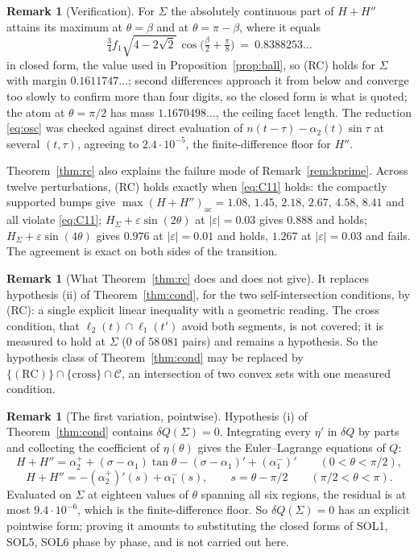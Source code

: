 \documentclass[11pt]{article}
\theoremstyle{definition}
\newtheorem{remark}[theorem]{Remark}
\newcommand{\Sig}{\Sigma}
\begin{document}
\begin{remark}[Verification]\label{rem:rcnum}
For $\Sig$ the absolutely continuous part of $H+H''$ attains its maximum at $\theta=\beta$
and at $\theta=\pi-\beta$, where it equals
\[
  \tfrac34f_1\sqrt{4-2\sqrt2}\,\cos\bigl(\tfrac\beta2+\tfrac\pi8\bigr)
  \ =\ 0.8388253\ldots
\]
in closed form, the value used in Proposition~\ref{prop:ball}, so (RC) holds for $\Sig$
with margin $0.1611747\ldots$; second differences approach it from below and converge too
slowly to confirm more than four digits, so the closed form is what is quoted; the atom at $\theta=\pi/2$
has mass $1.1670498\ldots$, the ceiling facet length. The reduction \eqref{eq:osc} was
checked against direct evaluation of $n(t-\tau)-\alpha_2(t)\sin\tau$ at several
$(t,\tau)$, agreeing to $2.4\cdot10^{-5}$, the finite-difference floor for $H''$.

Theorem~\ref{thm:rc} also explains the failure mode of Remark~\ref{rem:kprime}. Across
twelve perturbations, (RC) holds exactly when \eqref{eq:C11} holds:
the compactly supported bumps give
$\max(H+H'')_{\mathrm{ac}}=1.08,\,1.45,\,2.18,\,2.67,\,4.58,\,8.41$ and all violate
\eqref{eq:C11}; $H_\Sig+\varepsilon\sin(2\theta)$ at $|\varepsilon|=0.03$ gives $0.888$
and holds; $H_\Sig+\varepsilon\sin(4\theta)$ gives $0.976$ at $|\varepsilon|=0.01$ and
holds, $1.267$ at $|\varepsilon|=0.03$ and fails. The agreement is exact on both sides of
the transition.
\end{remark}

\begin{remark}[What Theorem~\ref{thm:rc} does and does not give]
It replaces hypothesis (ii) of Theorem~\ref{thm:cond}, for the two self-intersection
conditions, by (RC): a single explicit linear inequality with a geometric reading. The
cross condition, that $\ell_2(t)\cap\ell_1(t')$ avoid both segments, is not covered; it is
measured to hold at $\Sig$ ($0$ of $58\,081$ pairs) and remains a hypothesis. So the
hypothesis class of Theorem~\ref{thm:cond} may be replaced by
$\{(\text{RC})\}\cap\{\text{cross}\}\cap\mathcal C$, an intersection of two convex sets
with one measured condition.
\end{remark}

\begin{remark}[The first variation, pointwise]\label{rem:el}
Hypothesis (i) of Theorem~\ref{thm:cond} contains $\delta Q(\Sig)=0$. Integrating every
$\eta'$ in $\delta Q$ by parts and collecting the coefficient of $\eta(\theta)$ gives the
Euler--Lagrange equations of $Q$:
\[
  H+H''=\alpha_2^++(\sigma-\alpha_1)\tan\theta-(\sigma-\alpha_1)'+(\alpha_1^-)'
  \qquad(0<\theta<\pi/2),
\]
\[
  H+H''=-(\alpha_2^+)'(s)+\alpha_1^-(s),\qquad s=\theta-\pi/2
  \qquad(\pi/2<\theta<\pi).
\]
Evaluated on $\Sig$ at eighteen values of $\theta$ spanning all six regions, the residual
is at most $9.4\cdot10^{-6}$, which is the finite-difference floor. So $\delta Q(\Sig)=0$
has an explicit pointwise form; proving it amounts to substituting the closed forms of
SOL1, SOL5, SOL6 phase by phase, and is not carried out here.
\end{remark}
\end{document}
